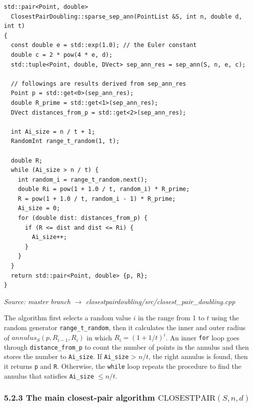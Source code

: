 \documentclass[12pt,english,]{article}
\newcommand{\code}[1]{\colorbox{light-gray}{\texttt{#1}}}
\newcommand{\pnt}[1]{{\scriptstyle#1}}
\begin{document}
\begin{lstlisting}
std::pair<Point, double>
  ClosestPairDoubling::sparse_sep_ann(PointList &S, int n, double d, int t)
{
  const double e = std::exp(1.0); // the Euler constant
  double c = 2 * pow(4 * e, d);
  std::tuple<Point, double, DVect> sep_ann_res = sep_ann(S, n, e, c);

  // followings are results derived from sep_ann_res
  Point p = std::get<0>(sep_ann_res);
  double R_prime = std::get<1>(sep_ann_res);
  DVect distances_from_p = std::get<2>(sep_ann_res);

  int Ai_size = n / t + 1;
  RandomInt range_t_random(1, t);

  double R;
  while (Ai_size > n / t) {
    int random_i = range_t_random.next();
    double Ri = pow(1 + 1.0 / t, random_i) * R_prime;
    R = pow(1 + 1.0 / t, random_i - 1) * R_prime;
    Ai_size = 0;
    for (double dist: distances_from_p) {
      if (R <= dist and dist <= Ri) {
        Ai_size++;
      }
    }
  }
  return std::pair<Point, double> {p, R};
}
\end{lstlisting}
\vspace{-9truemm}
\begin{minipage}{1\textwidth}
  \begin{flushright}
  {\footnotesize \emph{Source: master branch $\rightarrow$ closestpairdoubling/src/closest\_pair\_doubling.cpp}\par}
  \end{flushright}
\end{minipage}
\vspace{0.5truemm}

The algorithm first selects a random value \(i\) in the range from 1 to
\(t\) using the random generator \code{range\_t\_random}, then it
calculates the inner and outer radius of \(annulus_S(p, R_{i-1}, R_i)\)
in which \(R_i = (1+1/t)^i\). An inner \code{for} loop goes through
\code{distance\_from\_p} to count the number of points in the annulus
and then stores the number to \code{Ai\_size}. If \code{Ai\_size}
\textgreater{} \(n/t\), the right annulus is found, then it returns
\code{p} and \code{R}. Otherwise, the \code{while} loop repeats the
procedure to find the annulus that satisfies \code{Ai\_size}
\(\leq n/t\).

\hypertarget{section5.2.3}{%
\subsubsection{\texorpdfstring{5.2.3 The main closest-pair algorithm
\(\mathrm{C\pnt{LOSEST}P\pnt{AIR}}(S,n,d)\)}{5.2.3 The main closest-pair algorithm \textbackslash{}mathrm\{C\textbackslash{}pnt\{LOSEST\}P\textbackslash{}pnt\{AIR\}\}(S,n,d)}}\label{section5.2.3}}
\end{document}
